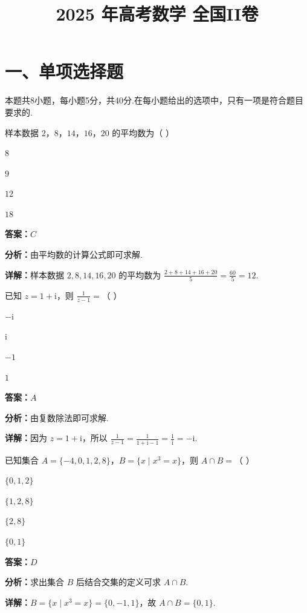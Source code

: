 ﻿\title{2025 年高考数学 全国II卷}
\date{}
\maketitle

\section*{一、单项选择题}
本题共8小题，每小题5分，共40分.在每小题给出的选项中，只有一项是符合题目要求的.

\begin{question}[points=5]
样本数据 $2$，$8$，$14$，$16$，$20$ 的平均数为（ ）
\begin{choices}
  \item $8$
  \item $9$
  \item $12$
  \item $18$
\end{choices}
\begin{solution}
\textbf{答案：}$C$

\textbf{分析：}由平均数的计算公式即可求解.

\textbf{详解：}样本数据 $2,8,14,16,20$ 的平均数为 $\frac{2+8+14+16+20}{5}=\frac{60}{5}=12$.
\end{solution}
\end{question}

\begin{question}[points=5]
已知 $z=1+\mathrm{i}$，则 $\frac{1}{z-1}=$（ ）
\begin{choices}
  \item $-\mathrm{i}$
  \item $\mathrm{i}$
  \item $-1$
  \item $1$
\end{choices}
\begin{solution}
\textbf{答案：}$A$

\textbf{分析：}由复数除法即可求解.

\textbf{详解：}因为 $z=1+\mathrm{i}$，所以 $\frac{1}{z-1}=\frac{1}{1+\mathrm{i}-1}=\frac{1}{\mathrm{i}}=-\mathrm{i}$.
\end{solution}
\end{question}

\begin{question}[points=5]
已知集合 $A=\{-4,0,1,2,8\}$，$B=\{x\mid x^3=x\}$，则 $A\cap B=$（ ）
\begin{choices}
  \item $\{0,1,2\}$
  \item $\{1,2,8\}$
  \item $\{2,8\}$
  \item $\{0,1\}$
\end{choices}
\begin{solution}
\textbf{答案：}$D$

\textbf{分析：}求出集合 $B$ 后结合交集的定义可求 $A\cap B$.

\textbf{详解：}$B=\{x\mid x^3=x\}=\{0,-1,1\}$，故 $A\cap B=\{0,1\}$.
\end{solution}
\end{question}

